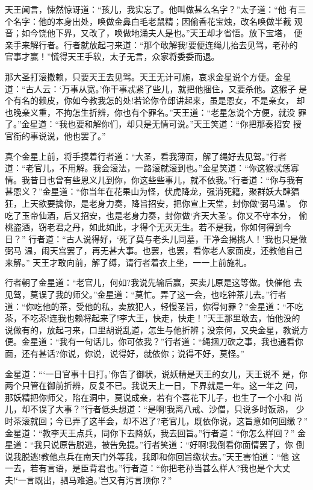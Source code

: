 天王闻言，悚然惊讶道：“孩儿，我实忘了。他叫做甚么名字？”太子道：“他
有三个名字：他的本身出处，唤做金鼻白毛老鼠精；因偷香花宝烛，改名唤做半截
观音；如今饶他下界，又改了，唤做地涌夫人是也。”天王却才省悟。放下宝塔，
便亲手来解行者。行者就放起刁来道：“那个敢解我!要便连绳儿抬去见驾，老孙的
官事才赢！”慌得天王手软，太子无言，众家将委委而退。

那大圣打滚撒赖，只要天王去见驾。天王无计可施，哀求金星说个方便。金星
道：“古人云：‘万事从宽。’你干事忒紧了些儿，就把他捆住，又要杀他。这猴子
是个有名的赖皮，你如今教我怎的处!若论你令郎讲起来，虽是恩女，不是亲女，
却也晚亲义重，不拘怎生折辨，你也有个罪名。”天王道：“老星怎说个方便，就没
罪了。”金星道：“我也要和解你们，却只是无情可说。”天王笑道：“你把那奏招安
授官衔的事说说，他也罢了。”

真个金星上前，将手摸着行者道：“大圣，看我薄面，解了绳好去见驾。”行者
道：“老官儿，不用解。我会滚法，一路滚就滚到也。”金星笑道：“你这猴忒恁寡
情。我昔日也曾有些恩义儿到你，你这些些事儿，就不依我。”行者道：“你与我有
甚恩义？”金星道：“你当年在花果山为怪，伏虎降龙，强消死籍，聚群妖大肆猖
狂，上天欲要擒你，是老身力奏，降旨招安，把你宣上天堂，封你做‘弼马温’。
你吃了玉帝仙酒，后又招安，也是老身力奏，封你做‘齐天大圣’。你又不守本分，
偷桃盗酒，窃老君之丹，如此如此，才得个无灭无生。若不是我，你如何得到今日？”
行者道：“古人说得好，‘死了莫与老头儿同墓，干净会揭挑人！’我也只是做弼马
温，闹天宫罢了，再无甚大事。也罢，也罢，看你老人家面皮，还教他自己来解。”
天王才敢向前，解了缚，请行者着衣上坐，一一上前施礼。

行者朝了金星道：“老官儿，何如?我说先输后赢，买卖儿原是这等做。快催他
去见驾，莫误了我的师父。”金星道：“莫忙。弄了这一会，也吃钟茶儿去。”行者
道：“你吃他的茶，受他的私，卖放犯人，轻慢圣旨，你得何罪？”金星道：“不吃
茶，不吃茶!连我也赖将起来了!李大王，快走，快走！”天王那里敢去，怕他没的
说做有的，放起刁来，口里胡说乱道，怎生与他折辨；没奈何，又央金星，教说方
便。金星道：“我有一句话儿，你可依我？”行者道：“绳捆刀砍之事，我也通看你
面，还有甚话?你说，你说，说得好，就依你；说得不好，莫怪。”

金星道：“‘一日官事十日打。’你告了御状，说妖精是天王的女儿，天王说不
是，你两个只管在御前折辨，反复不已。我说天上一日，下界就是一年。这一年之
间，那妖精把你师父，陷在洞中，莫说成亲，若有个喜花下儿子，也生了一个小和
尚儿，却不误了大事？”行者低头想道：“是啊!我离八戒、沙僧，只说多时饭熟，
少时茶滚就回；今已弄了这半会，却不迟了?老官儿，既依你说，这旨意如何回缴？”
金星道：“教李天王点兵，同你下去降妖，我去回旨。”行者道：“你怎么样回？”
金星道：“我只说原告脱逃，被告免提。”行者笑道：“好啊!我倒看你面情罢了，你
倒说我脱逃!教他点兵在南天门外等我，我即和你回旨缴状去。”天王害怕道：“他
这一去，若有言语，是臣背君也。”行者道：“你把老孙当甚么样人?我也是个大丈
夫!‘一言既出，驷马难追。’岂又有污言顶你？”

